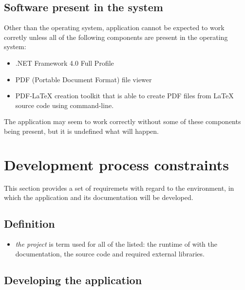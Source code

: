 \documentclass{article}
\begin{document}
\subsection{Software present in the system}

Other than the operating system, application cannot be expected to work corretly unless all of the
following components are present in the operating system:

\begin{itemize}

  \item .NET Framework 4.0 Full Profile

  \item PDF (Portable Document Format) file viewer

  \item PDF-LaTeX creation toolkit that is able to create PDF files from LaTeX source code using
  command-line.

\end{itemize} 

The application may seem to work correctly without some of these components being present, but it is
undefined what will happen.

\section{Development process constraints}

This section provides a set of requiremets with regard to the environment, in which the application
and its documentation will be developed.

\subsection*{Definition}

\begin{itemize}

  \item \textit{the project} is term used for all of the listed: the runtime of \titletext{} with the
  documentation, the source code and required external libraries.

\end{itemize}

\subsection{Developing the application}
\end{document}
